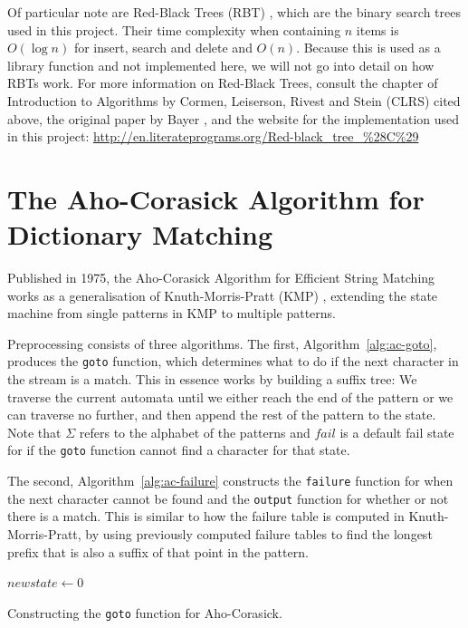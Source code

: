 \documentclass[ %
                    author={Dominic Joseph Moylett},
                    degree={MEng},
                     title={Dictionary Matching with Fingerprints},
                  subtitle={An Empirical Analysis},
                      type={research},
                      year={2015} ]{dissertation}
\begin{document}
Of particular note are Red-Black Trees (RBT) \cite[pp 308-338]{clrs}, which are the binary search trees used in this project. Their time complexity when containing $n$ items is $O(\log n)$ for insert, search and delete and $O(n)$. Because this is used as a library function and not implemented here, we will not go into detail on how RBTs work. For more information on Red-Black Trees, consult the chapter of Introduction to Algorithms by Cormen, Leiserson, Rivest and Stein (CLRS) cited above, the original paper by Bayer \cite{bayer:rbt}, and the website for the implementation used in this project: \url{http://en.literateprograms.org/Red-black_tree_%28C%29}

\section{The Aho-Corasick Algorithm for Dictionary Matching}
\label{sec:aho-corasick}

Published in 1975, the Aho-Corasick Algorithm for Efficient String Matching \cite{Aho:1975:ESM:360825.360855} works as a generalisation of Knuth-Morris-Pratt (KMP) \cite{kmp}, extending the state machine from single patterns in KMP to multiple patterns.

Preprocessing consists of three algorithms. The first, Algorithm~\ref{alg:ac-goto}, produces the \texttt{goto} function, which determines what to do if the next character in the stream is a match. This in essence works by building a suffix tree: We traverse the current automata until we either reach the end of the pattern or we can traverse no further, and then append the rest of the pattern to the state. Note that $\Sigma$ refers to the alphabet of the patterns and $fail$ is a default fail state for if the \texttt{goto} function cannot find a character for that state.

The second, Algorithm~\ref{alg:ac-failure} constructs the \texttt{failure} function for when the next character cannot be found and the \texttt{output} function for whether or not there is a match. This is similar to how the failure table is computed in Knuth-Morris-Pratt, by using previously computed failure tables to find the longest prefix that is also a suffix of that point in the pattern.

\begin{algorithm}[t]
$newstate \gets 0$\\
\caption{Constructing the \texttt{goto} function for Aho-Corasick.}
\label{alg:ac-goto}
\end{algorithm}
\end{document}
